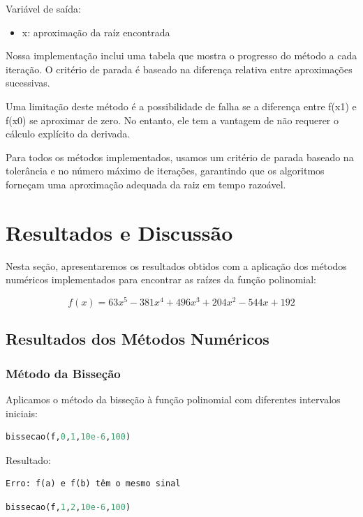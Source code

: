 \documentclass{article}
\begin{document}
Vari\'{a}vel de sa\'{i}da:
\begin{itemize}
    \item x: aproxima\c{c}\~{a}o da ra\'{i}z encontrada
\end{itemize}
Nossa implementação inclui uma tabela que mostra o progresso do método a cada iteração. O critério de parada é baseado na diferença relativa entre aproximações sucessivas.

Uma limitação deste método é a possibilidade de falha se a diferença entre f(x1) e f(x0) se aproximar de zero. No entanto, ele tem a vantagem de não requerer o cálculo explícito da derivada.

Para todos os métodos implementados, usamos um critério de parada baseado na tolerância e no número máximo de iterações, garantindo que os algoritmos forneçam uma aproximação adequada da raiz em tempo razoável.


\section{Resultados e Discuss\~{a}o}
Nesta se\c{c}\~{a}o, apresentaremos os resultados obtidos com a aplica\c{c}\~{a}o dos m\'{e}todos num\'{e}ricos implementados para encontrar as ra\'{i}zes da fun\c{c}\~{a}o polinomial:

\begin{equation}
    f(x) = 63x^5 - 381x^4 + 496x^3 + 204x^2 - 544x + 192
\end{equation}
\subsection{Resultados dos Métodos Numéricos}

\subsubsection{Método da Bisseção}
Aplicamos o método da bisseção à função polinomial com diferentes intervalos iniciais:

\begin{lstlisting}[language=Python]
bissecao(f,0,1,10e-6,100)
\end{lstlisting}

Resultado:
\begin{verbatim}
Erro: f(a) e f(b) têm o mesmo sinal
\end{verbatim}

\begin{lstlisting}[language=Python]
bissecao(f,1,2,10e-6,100)
\end{lstlisting}
\end{document}
